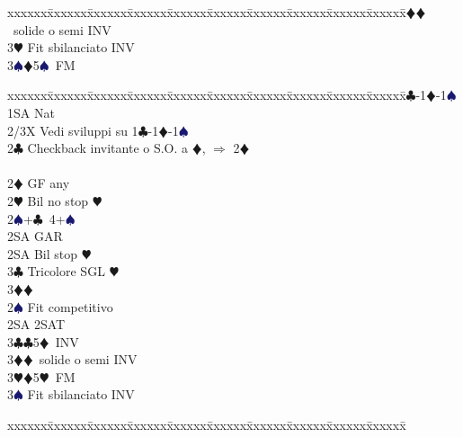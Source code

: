 \documentclass[a4paper,italian]{article}
\newcommand{\BC}{\textcolor{OliveGreen}{$\clubsuit$}}
\newcommand{\BD}{\textcolor{RedOrange}{$\vardiamondsuit$}}
\newcommand{\BH}{\textcolor{Red2}{$\varheartsuit${}}}
\newcommand{\BS}{\textcolor{MidnightBlue}{$\spadesuit${}}}
\newenvironment{bidtable}
{\begin{tabbing}

    xxxxxx\=xxxxxx\=xxxxxx\=xxxxxx\=xxxxxx\=xxxxxx\=xxxxxx\=xxxxxx\=xxxxxx\=xxxxxx\=\kill}
{\end{tabbing} }%
\begin{document}
\begin{multicols}{2}
\begin{bidtable}
                                        3\BD {}\BD\ solide o semi INV\\
                                        3\BH \> Fit sbilanciato INV\\
                                        3\BS {}\BD 5\BS\ FM\-
                                    \end{bidtable}
                                    \bigbreak
                                    \begin{bidtable}
                                        1\BC-1\BD-1\BS\+\\
                                        1SA \> Nat\+\\
                                        2/3X \> Vedi sviluppi su 1\BC -1\BD -1\BS \-\\
                                        2\BC \> Checkback invitante o S.O. a \BD , $\Rightarrow$ 2\BD \\
                                        \\
                                        2\BD \> GF any\+\\
                                        2\BH \> Bil no stop \BH \\
                                        2\BS {}+\BC\ 4+\BS \+\\
                                        2SA \> GAR\-\\
                                        2SA \> Bil stop \BH \\
                                        3\BC \> Tricolore SGL \BH \\
                                        3\BD {}\BD \-\\
                                        [2pt]2\BS \> Fit competitivo\\
                                        2SA \> 2SAT\\
                                        3\BC {}\BC 5\BD\ INV\\
                                        3\BD {}\BD\ solide o semi INV\\
                                        3\BH {}\BD 5\BH\ FM\\
                                        3\BS \> Fit sbilanciato INV\-
                                    \end{bidtable}
                                    \bigbreak
                                    \begin{bidtable}

\end{bidtable}
\end{multicols}
\end{document}
